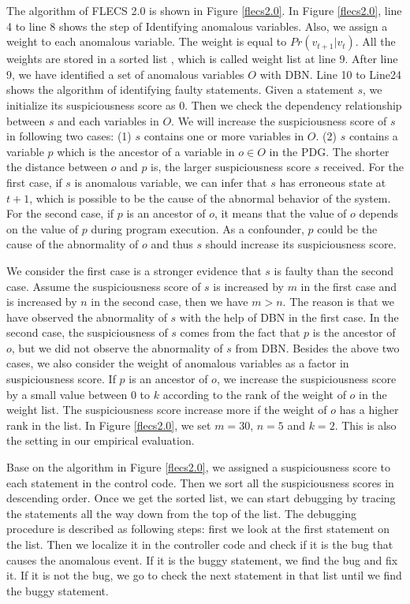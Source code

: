 The algorithm of FLECS 2.0 is shown in Figure \ref{flecs2.0}. In Figure \ref{flecs2.0}, line 4 to line 8 shows the step of Identifying anomalous variables.  Also, we assign a weight to each anomalous variable. The weight is equal to $Pr(v_{t+1}|v_t)$. All the weights are stored in a sorted list , which is called weight list at line 9.  After line 9, we have identified a set of anomalous variables $O$ with DBN.  Line 10 to Line24 shows the algorithm of identifying faulty statements. Given a statement $s$, we initialize its suspiciousness score as 0. Then we check the dependency relationship between $s$ and each variables in $O$. We will increase the suspiciousness score of $s$ in following two cases: (1) $s$ contains one or more variables in $O$. (2) $s$ contains a variable $p$ which is the ancestor of a variable in $o \in O$ in the PDG. The shorter the distance between $o$ and $p$ is, the larger suspiciousness score $s$ received. For the first case, if $s$ is anomalous variable, we can infer that $s$ has erroneous state at $t+1$, which is possible to be the cause of the abnormal behavior of the system. For the second case, if $p$ is an ancestor of $o$, it means that the value of $o$ depends on the value of $p$ during program execution. As a confounder, $p$ could be the cause of the abnormality of $o$ and thus $s$ should increase its suspiciousness score. 

We consider the first case is a stronger evidence that $s$ is faulty than the second case.  Assume the suspiciousness score of $s$ is increased by $m$ in the first case and is increased by $n$ in the second case, then we have $m>n$. The reason is that we have observed the abnormality of $s$ with the help of DBN in the first case. In the second case, the suspiciousness of $s$ comes from the fact that $p$ is the ancestor of $o$,  but we did not observe the abnormality of $s$ from DBN.  Besides the above two cases, we also consider the weight of anomalous variables as a factor in suspiciousness score. If $p$ is an ancestor of $o$, we increase the suspiciousness score by a small value between 0 to $k$ according to the rank of the weight of $o$ in the weight list. The suspiciousness score increase more if the weight of $o$ has a higher rank in the list. In Figure \ref{flecs2.0}, we set $m=30$, $n=5$ and $k=2$. This is also the setting in our empirical evaluation.

Base on the algorithm in Figure \ref{flecs2.0}, we assigned a suspiciousness score to each statement in the control code. Then we sort all the suspiciousness scores in descending order. Once we get the sorted list, we can start debugging by tracing the statements all the way down from the top of the list. The debugging procedure is described as following steps: first we look at the first statement on the list. Then we localize it in the controller code and check if it is the bug that causes the anomalous event. If it is the buggy statement, we find the bug and fix it. If it is not the bug, we go to check the next statement in that list until we find the buggy statement.

